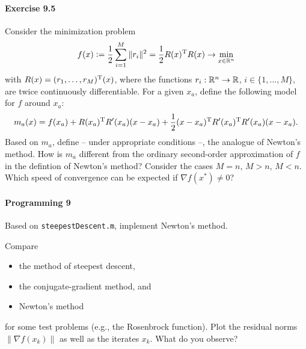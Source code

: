 \paragraph{Exercise 9.5}
Consider the minimization problem
\[
  f(x)\mathrel{\mathop:}= \frac{1}{2}\sum_{i=1}^M\|r_i\|^2 = \frac{1}{2}R(x)^{\text{\upshape T}} R(x) \to \min_{x\in\mathbb{R}^n}
\]
with $R(x)=(r_1,\dots,r_M)^{\text{\upshape T}}(x)$, where the functions $r_i:\mathbb{R}^n\to\mathbb{R}$, $i\in\{1,\dots,M\}$, are twice continuously differentiable. For a given $x_a$, define the following model for $f$ around $x_a$:
\[
  m_a(x) = f(x_a)
         + R(x_a)^{\text{\upshape T}} R'(x_a)(x-x_a)
         + \frac{1}{2} (x-x_a)^{\text{\upshape T}} R'(x_a)^{\text{\upshape T}} R'(x_a)(x-x_a).
\]
Based on $m_a$, define -- under appropriate conditions --, the analogue of
Newton's method. How is $m_a$ different from the ordinary second-order
approximation of $f$ in the defintion of Newton's method? Consider the cases
$M=n$, $M>n$, $M<n$. Which speed of convergence can be expected if $\nabla
f(x^*)\neq 0$?

\paragraph{Programming 9}
Based on \texttt{steepestDescent.m}, implement Newton's method.

Compare
\begin{itemize}
  \item the method of steepest descent,
  \item the conjugate-gradient method, and
  \item Newton's method
\end{itemize}
for some test problems (e.g., the Rosenbrock function). Plot the residual
norms $\|\nabla f(x_k)\|$ as well as the iterates $x_k$. What do you observe?


